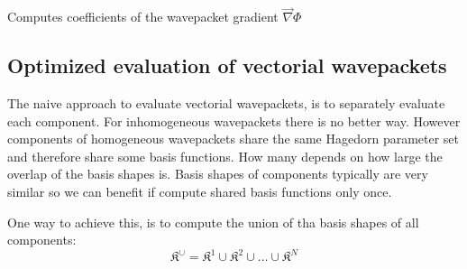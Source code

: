 \documentclass{article}
\begin{document}
\begin{algorithm}[H]
  \Input{\(\varepsilon\)}
  \caption{Computes coefficients of the wavepacket gradient \(\vec{\nabla} \Phi\)}
\end{algorithm}

\subsection{Optimized evaluation of vectorial wavepackets}
The naive approach to evaluate vectorial wavepackets, is to separately
evaluate each component. For inhomogeneous wavepackets there is
no better way.
However components of homogeneous wavepackets share the same Hagedorn parameter set
and therefore share some basis functions. How many depends on how large the overlap of
the basis shapes is. Basis shapes of components typically are very similar so
we can benefit if compute shared basis functions only once.

One way to achieve this, is to compute the union of tha
basis shapes of all components:
\[
\mathfrak{K}^{\cup} = \mathfrak{K}^1 \cup \mathfrak{K}^2 \cup \dots \cup \mathfrak{K}^N
\]
\end{document}
